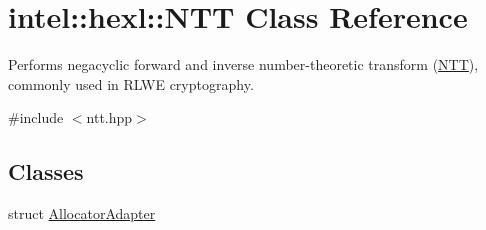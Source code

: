 \hypertarget{classintel_1_1hexl_1_1NTT}{}\section{intel\+:\+:hexl\+:\+:N\+TT Class Reference}
\label{classintel_1_1hexl_1_1NTT}


Performs negacyclic forward and inverse number-\/theoretic transform (\hyperlink{classintel_1_1hexl_1_1NTT}{N\+TT}), commonly used in R\+L\+WE cryptography.  




{\ttfamily \#include $<$ntt.\+hpp$>$}

\subsection*{Classes}
\begin{DoxyCompactItemize}
\item 
struct \hyperlink{structintel_1_1hexl_1_1NTT_1_1AllocatorAdapter}{Allocator\+Adapter}
\end{DoxyCompactItemize}
